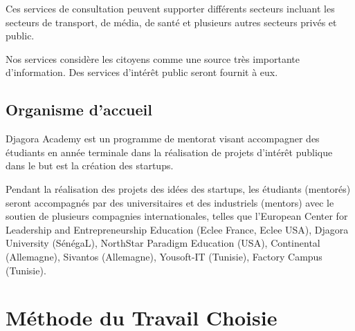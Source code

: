 Ces services de consultation peuvent supporter différents secteurs incluant les
secteurs de transport, de média, de santé et plusieurs autres secteurs privés
et public.

Nos services considère les citoyens comme une source très importante
d'information. Des services d'intérêt public seront fournit à eux.

\subsection{Organisme d'accueil}

Djagora Academy est un programme de mentorat visant accompagner des étudiants
en année terminale dans la réalisation de projets d'intérêt publique dans le
but est la création des startups.

Pendant la réalisation des projets des idées des startups, les étudiants
(mentorés) seront accompagnés par des universitaires et des industriels
(mentors) avec le soutien de plusieurs compagnies internationales, telles que
l'European Center for Leadership and Entrepreneurship Education (Eclee France,
Eclee USA), Djagora University (SénégaL), NorthStar Paradigm Education (USA),
Continental (Allemagne), Sivantos (Allemagne), Yousoft-IT (Tunisie), Factory
Campus (Tunisie).



\section{Méthode du Travail Choisie}

